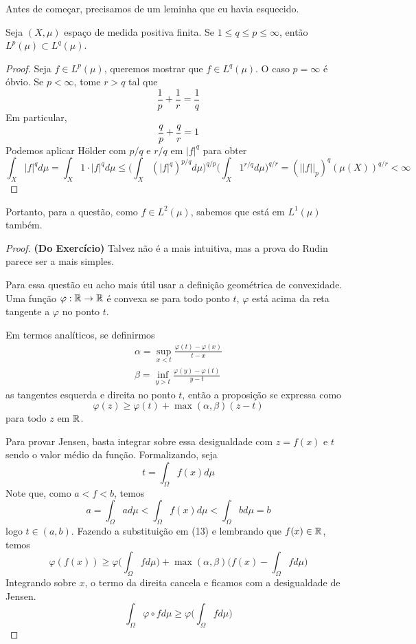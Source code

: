 \begin{problem}
    \label{prob:l5:3}
\end{problem}
Antes de começar, precisamos de um leminha que eu havia esquecido.
\begin{lemma}
    Seja $(X,\mu)$ espaço de medida positiva finita. Se $1 \leq q \leq p \leq \infty$, 
    então $L^p(\mu) \subset L^q(\mu)$.
\end{lemma}
\begin{proof}
    Seja $f \in L^p(\mu)$, queremos mostrar que $f \in L^q(\mu)$.
    O caso $p = \infty$ é óbvio. Se $p < \infty$, tome $r > q$ tal que 
    $$\frac{1}{p} + \frac{1}{r} = \frac{1}{q}$$
    Em particular,
    $$\frac{q}{p} + \frac{q}{r} = 1$$
    Podemos aplicar Hölder com $p/q$ e $r/q$ em $|f|^q$ para obter
    $$\int_X |f|^q d\mu = \int_X 1 \cdot |f|^q d\mu \leq \bigg(\int_X (|f|^q)^{p/q}d\mu \bigg)^{q/p} \bigg(\int_X 1^{r/q}d\mu\bigg)^{q/r} = (||f||_p)^q (\mu(X))^{q/r} < \infty$$
\end{proof}
Portanto, para a questão, como $f \in L^2(\mu)$, sabemos que está em $L^1(\mu)$ também.

\begin{proof} \textbf{(Do Exercício)}
    Talvez não é a mais intuitiva, mas a prova do Rudin parece ser a mais simples.
    
    Para essa questão eu acho mais útil usar a definição geométrica de convexidade. 
    Uma função $\varphi : \mathbb{R} \rightarrow \mathbb{R}$ é convexa se para todo ponto $t$, $\varphi$ está acima da reta tangente 
    a $\varphi$ no ponto $t$. 
    
    Em termos analíticos, se definirmos
    \begin{align*}
        \alpha = \sup_{x < t} \frac{\varphi(t) - \varphi(x)}{t - x}\\
        \beta = \inf_{y > t} \frac{\varphi(y) - \varphi(t)}{y - t}
    \end{align*}
    as tangentes esquerda e direita no ponto $t$, então a proposição se expressa como 
    \begin{equation}
        \varphi(z) \geq \varphi(t) + \max(\alpha,\beta)(z - t)
    \end{equation}
    para todo $z$ em $\mathbb{R}$.

    Para provar Jensen, basta integrar sobre essa desigualdade com $z = f(x)$ e $t$ sendo o valor médio da função.
    Formalizando, seja 
    $$t = \int_{\Omega}f(x) d\mu$$
    Note que, como $a < f < b$, temos 
    $$ a = \int_{\Omega} a d\mu < \int_{\Omega}f(x) d\mu < \int_{\Omega} b d\mu = b$$
    logo $t \in (a,b)$. Fazendo a substituição em (13) e lembrando que $f(x) \in \mathbb{R}$, temos 
    $$\varphi(f(x)) \geq \varphi\bigg(\int_\Omega f d\mu\bigg) + \max(\alpha,\beta)\bigg(f(x) - \int_\Omega f d\mu\bigg)$$
    Integrando sobre $x$, o termo da direita cancela e ficamos com a desigualdade de Jensen.
    $$\int_\Omega \varphi \circ f d\mu \geq \varphi\bigg(\int_\Omega f d\mu\bigg)$$
\end{proof}

